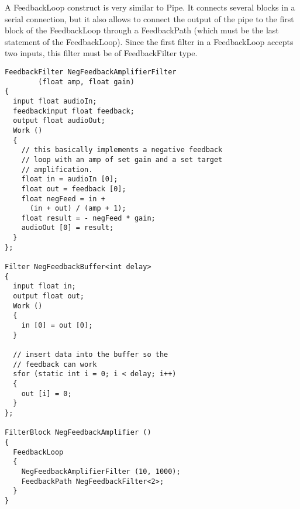 \documentclass[twocolumn, draft]{article}
\begin{document}
A FeedbackLoop construct is very similar to Pipe.  It connects
several blocks in a serial connection, but it also allows to connect
the output of the pipe to the first block of the FeedbackLoop through
a FeedbackPath (which must be the last statement of the FeedbackLoop).
Since the first filter in a FeedbackLoop accepts
two inputs, this filter must be of FeedbackFilter type.

\begin{verbatim}
FeedbackFilter NegFeedbackAmplifierFilter
        (float amp, float gain)
{
  input float audioIn;
  feedbackinput float feedback;
  output float audioOut;
  Work ()
  {
    // this basically implements a negative feedback
    // loop with an amp of set gain and a set target
    // amplification.
    float in = audioIn [0];
    float out = feedback [0];
    float negFeed = in + 
      (in + out) / (amp + 1);
    float result = - negFeed * gain;
    audioOut [0] = result;
  }
};

Filter NegFeedbackBuffer<int delay>
{
  input float in;
  output float out;
  Work ()
  {
    in [0] = out [0];
  }

  // insert data into the buffer so the
  // feedback can work
  sfor (static int i = 0; i < delay; i++)
  {
    out [i] = 0;
  }
};

FilterBlock NegFeedbackAmplifier ()
{
  FeedbackLoop
  {
    NegFeedbackAmplifierFilter (10, 1000);
    FeedbackPath NegFeedbackFilter<2>;
  }
}
\end{verbatim}

\begin{comment}

\end{comment}

\begin{comment}

\begin{figure}[t]
\centerline{\psfig{figure=block.ps}}
\vspace{-24pt}
\caption{\protect\small The block construct.}
\end{figure}

\section{old stuff}

\begin{lgrind}

\end{lgrind}

\end{comment}
\end{document}
